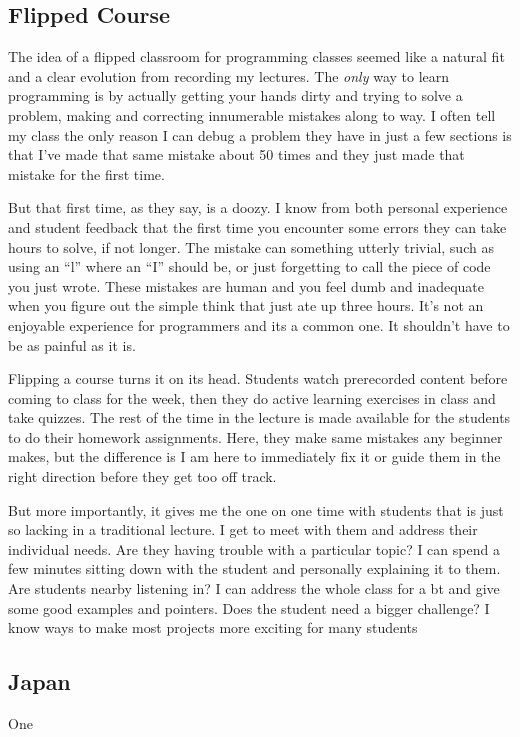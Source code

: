 \documentclass[10pt]{article}
\begin{document}
\subsection{Flipped Course}
The idea of a flipped classroom for programming classes seemed like a natural fit and  a clear evolution from recording my lectures.  
The \textit{only} way to learn programming is by actually getting your hands dirty and trying to solve a problem, making and correcting innumerable mistakes along to way.  
I often tell my class the only reason I can debug a problem  they have  in just a few sections is that I've made that same mistake about 50 times and they just made that mistake for the first time.

But that first time, as they say, is a doozy.  
I know from both personal experience  and student feedback that the first time you encounter some errors they can take hours to solve, if not longer.  
The mistake can  something utterly trivial, such as using an ``l'' where an ``I'' should be, or just forgetting to call the piece of code you just wrote.
These mistakes are human and you feel dumb and inadequate when you figure out the simple think that just ate up three hours.
It's not an enjoyable experience for programmers and its a common one.  
It shouldn't have to be as painful as it is.

Flipping a course turns it on its head.  
Students watch prerecorded content before coming to class for the week, then they do active learning exercises in class and take quizzes.  The rest of the time in the lecture is made available for the students to do their homework assignments.  Here, they make same mistakes any beginner makes, but the difference is I am here to immediately fix it or guide them in the right direction before they get too off track.


But more importantly, it gives me the one on one time with students that is just so lacking in a traditional lecture.  
I get to meet with them and address their individual needs.
Are they having trouble with a particular topic? I can spend a few minutes sitting down with the student and personally explaining it to them.  Are students nearby listening in?  I can address the whole class for a bt and give some good examples and pointers.  Does the student need a bigger challenge? I know ways to make most projects more exciting for many students




\subsection{Japan}
One 
\end{document}
